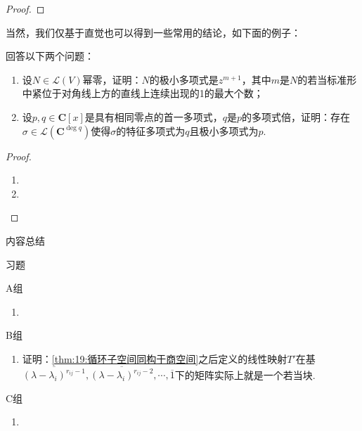 \begin{proof}

\end{proof}


当然，我们仅基于直觉也可以得到一些常用的结论，如下面的例子：
\begin{example}
    回答以下两个问题：
    \begin{enumerate}
        \item 设$N\in \mathcal{L}(V)$幂零，证明：$N$的极小多项式是$z^{m+1}$，其中$m$是$N$的若当标准形中紧位于对角线上方的直线上连续出现的1的最大个数；

        \item 设$p,q\in\mathbf{C}[x]$是具有相同零点的首一多项式，$q$是$p$的多项式倍，证明：存在$\sigma\in \mathcal{L}(\mathbf{C}^{\deg q})$使得$\sigma$的特征多项式为$q$且极小多项式为$p$.
    \end{enumerate}
\end{example}

\begin{proof}
    \begin{enumerate}
        \item

        \item
    \end{enumerate}
\end{proof}

\vspace{2ex}
\centerline{\heiti \Large 内容总结}

\vspace{2ex}
\centerline{\heiti \Large 习题}

\vspace{2ex}
{\kaishu }
\begin{flushright}
    \kaishu

\end{flushright}

\centerline{\heiti A组}
\begin{enumerate}
    \item
\end{enumerate}

\centerline{\heiti B组}
\begin{enumerate}
    \item 证明：\autoref{thm:19:循环子空间同构于商空间}之后定义的线性映射$T'$在基$\overline{(\lambda-\lambda_i)^{r_{ij}-1}},\overline{(\lambda-\lambda_i)^{r_{ij}-2}},\cdots,\overline{1}$下的矩阵实际上就是一个若当块.
\end{enumerate}

\centerline{\heiti C组}
\begin{enumerate}
    \item
\end{enumerate}
